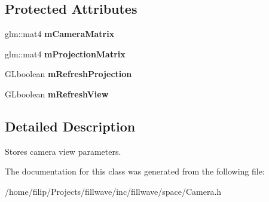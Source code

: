 \subsection*{Protected Attributes}
\begin{DoxyCompactItemize}
\item 
\hypertarget{classfillwave_1_1space_1_1Camera_acb895e864c01129aabfabc76e06b3a23}{}glm\+::mat4 {\bfseries m\+Camera\+Matrix}\label{classfillwave_1_1space_1_1Camera_acb895e864c01129aabfabc76e06b3a23}

\item 
\hypertarget{classfillwave_1_1space_1_1Camera_a22ab076a74ab323dd665b7a423e5f7a9}{}glm\+::mat4 {\bfseries m\+Projection\+Matrix}\label{classfillwave_1_1space_1_1Camera_a22ab076a74ab323dd665b7a423e5f7a9}

\item 
\hypertarget{classfillwave_1_1space_1_1Camera_af3c3782edbb20422d23bc18720ecfee4}{}G\+Lboolean {\bfseries m\+Refresh\+Projection}\label{classfillwave_1_1space_1_1Camera_af3c3782edbb20422d23bc18720ecfee4}

\item 
\hypertarget{classfillwave_1_1space_1_1Camera_a7829b046b733a9a88c5bd04cf51ee650}{}G\+Lboolean {\bfseries m\+Refresh\+View}\label{classfillwave_1_1space_1_1Camera_a7829b046b733a9a88c5bd04cf51ee650}

\end{DoxyCompactItemize}


\subsection{Detailed Description}
Stores camera view parameters. 

The documentation for this class was generated from the following file\+:\begin{DoxyCompactItemize}
\item 
/home/filip/\+Projects/fillwave/inc/fillwave/space/Camera.\+h\end{DoxyCompactItemize}
